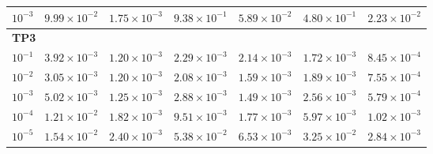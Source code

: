 \begin{table}[ht]
{\begin{tabular}{ccccccc}
$10^{-3}$ & $9.99\times10^{-2}$ & $1.75\times10^{-3}$ & $9.38\times10^{-1}$ & $5.89\times10^{-2}$ & $4.80\times10^{-1}$ & $2.23\times10^{-2}$ \\
\hline
\multicolumn{7}{l}{\textbf{TP3}} \\
\hline
$10^{-1}$ & $3.92\times10^{-3}$ & $1.20\times10^{-3}$ & $2.29\times10^{-3}$ & $2.14\times10^{-3}$ & $1.72\times10^{-3}$ & $8.45\times10^{-4}$ \\
$10^{-2}$ & $3.05\times10^{-3}$ & $1.20\times10^{-3}$ & $2.08\times10^{-3}$ & $1.59\times10^{-3}$ & $1.89\times10^{-3}$ & $7.55\times10^{-4}$ \\
$10^{-3}$ & $5.02\times10^{-3}$ & $1.25\times10^{-3}$ & $2.88\times10^{-3}$ & $1.49\times10^{-3}$ & $2.56\times10^{-3}$ & $5.79\times10^{-4}$ \\
$10^{-4}$ & $1.21\times10^{-2}$ & $1.82\times10^{-3}$ & $9.51\times10^{-3}$ & $1.77\times10^{-3}$ & $5.97\times10^{-3}$ & $1.02\times10^{-3}$ \\
$10^{-5}$ & $1.54\times10^{-2}$ & $2.40\times10^{-3}$ & $5.38\times10^{-2}$ & $6.53\times10^{-3}$ & $3.25\times10^{-2}$ & $2.84\times10^{-3}$ \\
\hline
\end{tabular}%
}
\end{table}
